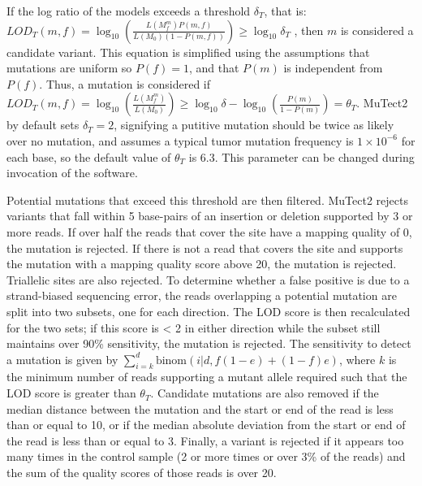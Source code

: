 If the log ratio of the models exceeds a threshold $\delta{}_T$, that is: $LOD_T(m,f)=\log_{10} \left(\frac{L(M_f^m)P(m,f)}{L(M_0)(1-P(m,f))}\right) \geq \log_{10} \delta{}_T$ , then $m$ is considered a candidate variant. This equation is simplified using the assumptions that mutations are uniform so $P(f)=1$, and that $P(m)$ is independent from $P(f)$. Thus, a mutation is considered if $LOD_T(m,f)=\log_{10} \left(\frac{L(M_f^m)}{L(M_0)}\right) \geq \log_{10} \delta{} - \log_{10}  \left(\frac{P(m)}{1-P(m)}\right) = \theta{}_T$. MuTect2 by default sets $\delta{}_T = 2$, signifying a putitive mutation should be twice as likely over no mutation, and assumes a typical tumor mutation frequency is $1 \times 10^{-6}$ for each base, so the default value of $\theta{}_T$ is 6.3. This parameter can be changed during invocation of the software.

Potential mutations that exceed this threshold are then filtered. MuTect2 rejects variants that fall within 5 base-pairs of an insertion or deletion supported by 3 or more reads. If over half the reads that cover the site have a mapping quality of 0, the mutation is rejected. If there is not a read that covers the site and supports the mutation with a mapping quality score above 20, the mutation is rejected. Triallelic sites are also rejected. To determine whether a false positive is due to a strand-biased sequencing error, the reads overlapping a potential mutation are split into two subsets, one for each direction. The LOD score is then recalculated for the two sets; if this score is < 2 in either direction while the subset still maintains over 90\% sensitivity, the mutation is rejected. The sensitivity to detect a mutation is given by $\sum_{i=k}^d \text{binom}(i|d,f(1-e)+(1-f)e)$, where $k$ is the minimum number of reads supporting a mutant allele required such that the LOD score is greater than $\theta{}_T$. Candidate mutations are also removed if the median distance between the mutation and the start or end of the read is less than or equal to 10, or if the median absolute deviation from the start or end of the read is less than or equal to 3. Finally, a variant is rejected if it appears too many times in the control sample (2 or more times or over 3\% of the reads) and the sum of the quality scores of those reads is over 20.

